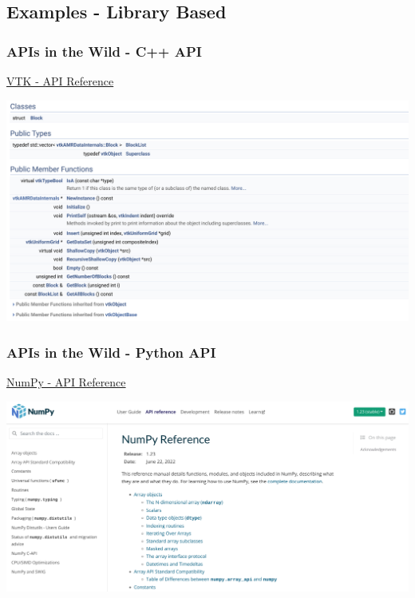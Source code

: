\documentclass[t]{beamer}
\begin{document}
\subsection{Examples - Library Based}

\begin{frame}
  \frametitle{APIs in the Wild - C++ API}
  \vspace{-10pt}

  \href{https://vtk.org/doc/nightly/html/index.html}{VTK - API Reference}

  \centering
  \includegraphics[height=.75\textheight]{./figures/vtk_api.png}

\end{frame}

\begin{frame}
  \frametitle{APIs in the Wild - Python API}
  \vspace{-10pt}

  \href{https://numpy.org/doc/stable/reference/}{NumPy - API Reference}

  \centering
  \includegraphics[height=.75\textheight]{./figures/numpy_api.png}

\end{frame}
\end{document}
